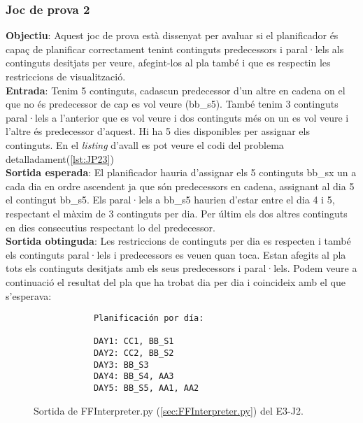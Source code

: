 \documentclass[a4paper]{article}
\begin{document}
	
	\subsubsection*{Joc de prova 2}
	
	\noindent \textbf{Objectiu}: Aquest joc de prova està dissenyat per avaluar si el planificador és capaç de planificar correctament tenint continguts predecessors i paral·lels als continguts desitjats per veure, afegint-los al pla també i que es respectin les restriccions de visualització. \\
	
	\noindent \textbf{Entrada}: Tenim 5 continguts, cadascun predecessor d'un altre en cadena on el que no és predecessor de cap es vol veure (bb\_s5). També tenim 3 continguts paral·lels a l'anterior que es vol veure i dos continguts més on un es vol veure i l'altre és predecessor d'aquest. Hi ha 5 dies disponibles per assignar els continguts. En el \textit{listing} d'avall es pot veure el codi del problema detalladament(\ref{lst:JP23})\\
	
	\noindent \textbf{Sortida esperada}: El planificador hauria d'assignar els 5 continguts bb\_sx un a cada dia en ordre ascendent ja que són predecessors en cadena, assignant al dia 5 el contingut bb\_s5. Els paral·lels a bb\_s5 haurien d'estar entre el dia 4 i 5, respectant el màxim de 3 continguts per dia. Per últim els dos altres continguts en dies consecutius respectant lo del predecessor.\\
	
	\noindent \textbf{Sortida obtinguda}: Les restriccions de continguts per dia es respecten i també els continguts paral·lels i predecessors es veuen quan toca. Estan afegits al pla tots els continguts desitjats amb els seus predecessors i paral·lels. Podem veure a continuació el resultat del pla que ha trobat dia per dia i coincideix amb el que s'esperava:
	
	\begin{figure}[H]
		\centering
		\begin{verbatim}
			Planificación por día:
			
			DAY1: CC1, BB_S1
			DAY2: CC2, BB_S2
			DAY3: BB_S3
			DAY4: BB_S4, AA3
			DAY5: BB_S5, AA1, AA2
		\end{verbatim}
		\caption{Sortida de FFInterpreter.py (\ref{sec:FFInterpreter.py}) del E3-J2.}
	\end{figure}
	
\end{document}
